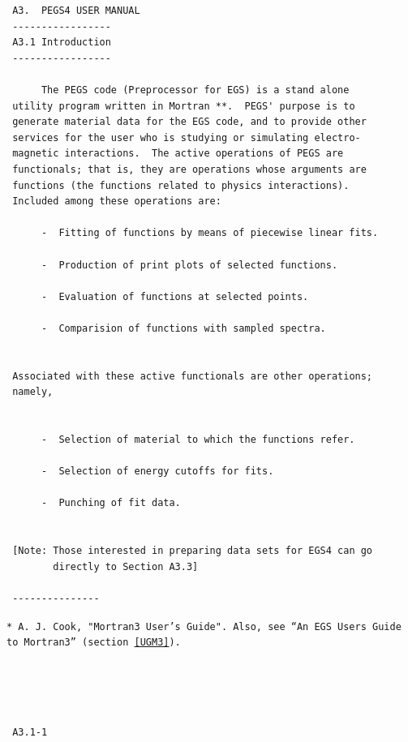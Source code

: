  \newpage {} \begin{verbatim}
 A3.  PEGS4 USER MANUAL
 -----------------
 A3.1 Introduction
 -----------------

      The PEGS code (Preprocessor for EGS) is a stand alone
 utility program written in Mortran **.  PEGS' purpose is to
 generate material data for the EGS code, and to provide other
 services for the user who is studying or simulating electro-
 magnetic interactions.  The active operations of PEGS are
 functionals; that is, they are operations whose arguments are
 functions (the functions related to physics interactions).
 Included among these operations are:

      -  Fitting of functions by means of piecewise linear fits.

      -  Production of print plots of selected functions.

      -  Evaluation of functions at selected points.

      -  Comparision of functions with sampled spectra.


 Associated with these active functionals are other operations;
 namely,


      -  Selection of material to which the functions refer.

      -  Selection of energy cutoffs for fits.

      -  Punching of fit data.


 [Note: Those interested in preparing data sets for EGS4 can go
        directly to Section A3.3]

 ---------------
\end{verbatim}
{\tt   ** A. J. Cook, "Mortran3 User's Guide"\cite{Co83}.  Also, see
``An EGS Users Guide to Mortran3'' (section~\ref{UGM3}).}
\begin{verbatim}




 A3.1-1
\end{verbatim}
\newpage
{}
